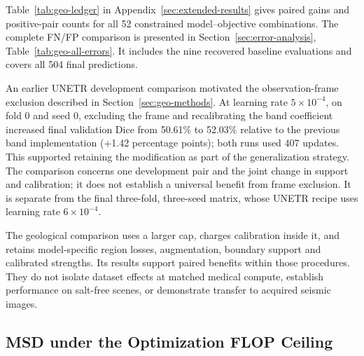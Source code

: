 \documentclass[12pt,a4paper]{article}
\begin{document}
Table~\ref{tab:geo-ledger} in Appendix~\ref{sec:extended-results}
gives paired gains and positive-pair counts for all 52 constrained
model--objective combinations. The complete FN/FP comparison is presented in
Section~\ref{sec:error-analysis}, Table~\ref{tab:geo-all-errors}.
It includes the nine recovered baseline evaluations and covers all
504 final predictions.

An earlier UNETR development comparison motivated the observation-frame
exclusion described in Section~\ref{sec:geo-methods}. At learning rate
$5\times10^{-4}$, on fold 0 and seed 0, excluding the frame and
recalibrating the band coefficient increased final validation Dice
from 50.61\% to 52.03\% relative to the previous band implementation
(+1.42 percentage points); both runs used 407 updates. This supported
retaining the modification as part of the generalization strategy.
The comparison concerns one development pair and the joint change in
support and calibration; it does not establish a universal benefit
from frame exclusion. It is separate from the final three-fold,
three-seed matrix, whose UNETR recipe uses learning rate
$6\times10^{-4}$.

The geological comparison uses a larger cap, charges calibration
inside it, and retains model-specific region losses, augmentation,
boundary support and calibrated strengths. Its results support paired
benefits within those procedures. They do not isolate dataset effects
at matched medical compute, establish performance on salt-free scenes,
or demonstrate transfer to acquired seismic images.

\FloatBarrier

\FloatBarrier
\subsection{MSD under the Optimization FLOP Ceiling}
\label{sec:main-msd-results}
\end{document}
